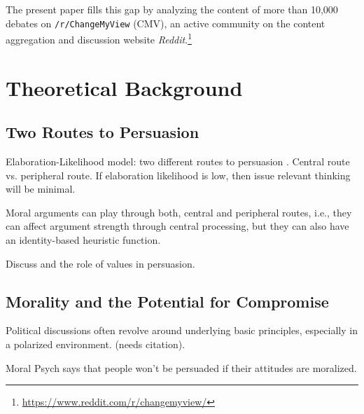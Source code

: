 The present paper fills this gap by analyzing the content of more than 10,000 debates on \texttt{/r/ChangeMyView} (CMV), an active community on the content aggregation and discussion website \textit{Reddit}.\footnote{\url{https://www.reddit.com/r/changemyview/}}




\section{Theoretical Background} %

\subsection{Two Routes to Persuasion}

Elaboration-Likelihood model: two different routes to persuasion \citet{petty1986elaboration}. Central route vs. peripheral route. If elaboration likelihood is low, then issue relevant thinking will be minimal. 

Moral arguments can play through both, central and peripheral routes, i.e., they can affect argument strength through central processing, but they can also have an identity-based heuristic function.

Discuss \citet{nelson2005values} and the role of values in persuasion.


\subsection{Morality and the Potential for Compromise}


Political discussions often revolve around underlying basic principles, especially in a polarized environment. (needs citation).

Moral Psych says that people won't be persuaded if their attitudes are moralized.


